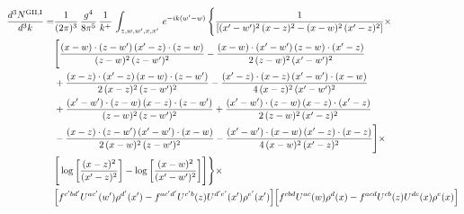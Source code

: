 \documentclass[9pt]{article}
\numberwithin{equation}{section}
\begin{document}
\begin{align}
\frac{d^{3}N^{\rm GII,I}}{d^{3}k}=&  \frac{1}{(2\pi)^{3}}\, \frac{g^{4}}{8\pi^{5}}\,\frac{1}{k^{+}}\,\int_{z,w,w^{\prime},x,x'}\, e^{-ik(w^{\prime}-w)}\, \Bigg\{ \frac{1}{\left[(x'-w')^{2}\, (x-z)^{2}-(x-w)^{2}\, (x'-z)^{2}\right]}\times\,\notag \\ & \Bigg[\frac{(x-w)\cdot (z-w')\, (x'-z)\cdot (z-w)}{(z-w)^{2}\,(z-w')^{2}}-\frac{(x-w)\cdot (x'-w')\, (z-w)\cdot (x'-z)}{2\, (z-w)^{2}\, (x'-w')^{2}}\notag \\ & + \frac{(x-z)\cdot (x'-z)\, (x-w)\cdot (z-w')}{2\, (x-z)^{2}\, (z-w')^{2}}-\frac{(x'-z)\cdot (x-z)\, (x'-w')\cdot (x-w)}{4\, (x-z)^{2}\, (x'-w')^{2}}\notag \\ & + \frac{(x'-w')\cdot (z-w)\, (x-z)\cdot (z-w')}{(z-w)^{2}\,(z-w')^{2}}+\frac{(x'-w')\cdot (z-w)\, (x-z)\cdot (x'-z)}{2\, (z-w)^{2}\, (x'-z)^{2}}\notag \\ & - \frac{(x-z)\cdot (z-w')\, (x'-w')\cdot (x-w)}{2\, (x-w)^{2}\, (z-w')^{2}} -\frac{(x'-w')\cdot (x-w)\, (x'-z)\cdot (x-z)}{4\, (x-w)^{2}\, (x'-z)^{2}}\Bigg]\times\notag \\ &  \Bigg[\log{\left[\frac{(x-z)^{2}}{ (x'-z)^{2}}\right]}-\log{\left[\frac{(x-w)^{2}}{(x'-w')^{2}}\right]}\Bigg]\Bigg\} \times\, \notag \\ & \Big[f^{c'bd'}U^{ac'}(w')\rho^{d'}(x')-f^{ac'd'}U^{c'b}(z)U^{d'e'}(x')\rho^{e'}(x')\Big]\Big[f^{cbd}U^{ac}(w)\rho^{d}(x)-f^{acd}U^{cb}(z)U^{de}(x)\rho^{e}(x)\Big]
\end{align}
\end{document}
